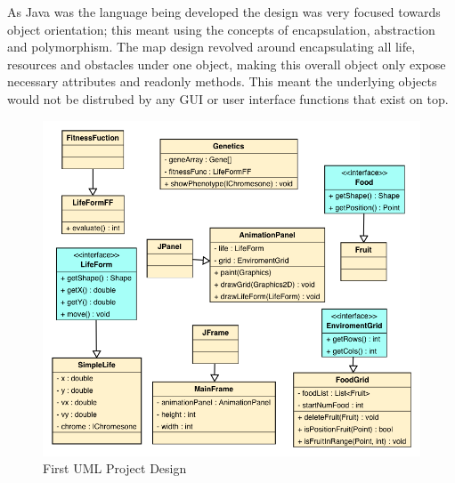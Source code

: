 \documentclass[12pt]{article}
\begin{document}
As Java was the language being developed the design was very focused towards object orientation; this meant using the concepts of encapsulation, abstraction
and polymorphism. The map design revolved around encapsulating all life, resources and obstacles under one object, making this overall object only expose 
necessary attributes and readonly methods. This meant the underlying objects would not be distrubed by any GUI or user interface functions that exist on top.  

\begin{figure} [ht]
\centering
\includegraphics[scale = 0.5]{uml1.png}
\caption{First UML Project Design}
\label{fig:umldiag1}
\end{figure}
\end{document}
